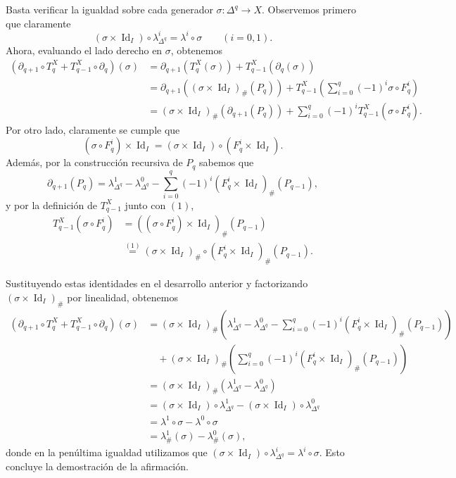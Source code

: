 \begin{dem}
Basta verificar la igualdad sobre cada generador $\sigma \colon \Delta^q \to X$. Observemos primero que claramente
\[
(\sigma \times \operatorname{Id}_I) \circ \lambda^i_{\Delta^q} = \lambda^i \circ \sigma \qquad (i = 0, 1).
\]
Ahora, evaluando el lado derecho en $\sigma$, obtenemos
\begin{align*}
(\partial_{q+1} \circ T_q^X + T_{q-1}^X \circ \partial_q)(\sigma)
&= \partial_{q+1}(T_q^X(\sigma)) + T_{q-1}^X(\partial_q(\sigma)) \\
&= \partial_{q+1}\!\left((\sigma \times \operatorname{Id}_I)_\#(P_q)\right) + T_{q-1}^X\!\left(\sum_{i=0}^q (-1)^i \sigma \circ F_q^i\right) \\
&= (\sigma \times \operatorname{Id}_I)_\#(\partial_{q+1}(P_q)) + \sum_{i=0}^q (-1)^i T_{q-1}^X(\sigma \circ F_q^i).
\end{align*}
Por otro lado, claramente se cumple que
\begin{equation}
\tag{1}
(\sigma \circ F_q^i) \times \operatorname{Id}_I = (\sigma \times \operatorname{Id}_I) \circ (F_q^i \times \operatorname{Id}_I).
\end{equation}
Además, por la construcción recursiva de $P_q$ sabemos que
\[
\partial_{q+1}(P_q) = \lambda^1_{\Delta^q} - \lambda^0_{\Delta^q} - \sum_{i=0}^q (-1)^i (F_q^i \times \operatorname{Id}_I)_\#(P_{q-1}),
\]
y por la definición de $T_{q-1}^X$ junto con $(1)$,
\begin{align*}
T_{q-1}^X(\sigma \circ F_q^i) &= ((\sigma \circ F_q^i) \times \operatorname{Id}_I)_\#(P_{q-1}) \\
&\stackrel{(1)}{=} (\sigma \times \operatorname{Id}_I)_\# \circ (F_q^i \times \operatorname{Id}_I)_\#(P_{q-1}).
\end{align*}

Sustituyendo estas identidades en el desarrollo anterior y factorizando $(\sigma \times \operatorname{Id}_I)_\#$ por linealidad, obtenemos
\begin{align*}
(\partial_{q+1} \circ T_q^X + T_{q-1}^X \circ \partial_q)(\sigma)
&= (\sigma \times \operatorname{Id}_I)_\#\!\left(\lambda^1_{\Delta^q} - \lambda^0_{\Delta^q} - \sum_{i=0}^q (-1)^i (F_q^i \times \operatorname{Id}_I)_\#(P_{q-1})\right) \\
&\quad + (\sigma \times \operatorname{Id}_I)_\#\!\left(\sum_{i=0}^q (-1)^i (F_q^i \times \operatorname{Id}_I)_\#(P_{q-1})\right) \\
&= (\sigma \times \operatorname{Id}_I)_\#(\lambda^1_{\Delta^q} - \lambda^0_{\Delta^q}) \\
&= (\sigma \times \operatorname{Id}_I) \circ \lambda^1_{\Delta^q} - (\sigma \times \operatorname{Id}_I) \circ \lambda^0_{\Delta^q} \\
&= \lambda^1 \circ \sigma - \lambda^0 \circ \sigma \\
&= \lambda^1_\#(\sigma) - \lambda^0_\#(\sigma),
\end{align*}
donde en la penúltima igualdad utilizamos que $(\sigma \times \operatorname{Id}_I) \circ \lambda^i_{\Delta^q} = \lambda^i \circ \sigma$. Esto concluye la demostración de la afirmación.


\end{dem}
